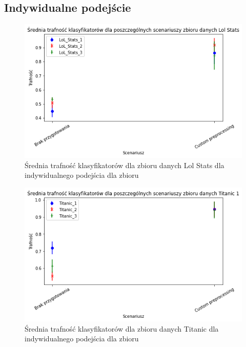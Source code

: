 \documentclass{book}
\begin{document}
\subsection{Indywidualne podejście}

\begin{figure}[H]
    \centerline{\includegraphics[scale=0.8]{Lol_Stats_Avg_Custom}}
    \centering
    \caption{Średnia trafność klasyfikatorów dla zbioru danych Lol Stats 
    dla indywidualnego podejścia dla zbioru}
    \end{figure}

\begin{figure}[H]
    \centerline{\includegraphics[scale=0.8]{Titanic_Avg_Custom}}
    \centering
    \caption{Średnia trafność klasyfikatorów dla zbioru danych Titanic 
    dla indywidualnego podejścia dla zbioru}
    \end{figure}
\end{document}
